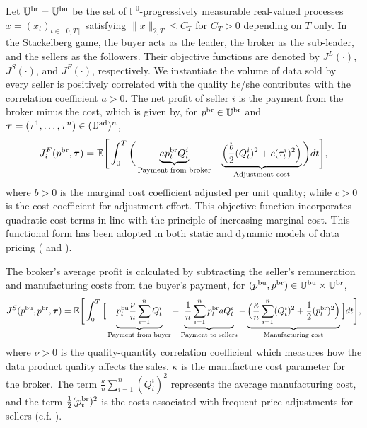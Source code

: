 \documentclass[11pt]{article}
\numberwithin{equation}{section}
\begin{document}
Let $\mathbb{U}^{\rm br}=\mathbb{U}^{\rm bu}$ be the set of $\mathbb{F}^0$-progressively measurable real-valued processes $x=(x_t)_{t\in[0,T]}$ satisfying $\|x\|_{2,T}\leq C_T$ for $C_T>0$ depending on $T$ only.	In the Stackelberg game, the buyer acts as the leader, the broker as the sub-leader, and the sellers as the followers. Their objective functions are denoted by $J^L(\cdot)$, $J^S(\cdot)$, and $J^F(\cdot)$, respectively.  We instantiate the volume of data sold by every seller is positively correlated with the quality he/she contributes with the correlation coefficient $a >0$. The net profit of seller $i$ is the payment from the broker minus the cost, which is given by, for $p^{\rm br}\in\mathbb{U}^{\rm br}$ and $\boldsymbol{\tau}=(\tau^1,\ldots,\tau^n)\in(\mathbb{U}^{{\rm ad}})^n$,
\begin{align}\label{eq:JiF}
		J_i^F(p^{\rm br}, \boldsymbol{\tau})=\mathbb{E}\Bigg[\int_0^T\bigg(\underbrace{a p_t^{\rm br}Q_t^i}_{\text{Payment from broker}}-\underbrace{\Big(\frac{b }{2}(Q_t^i)^2+c  (\tau_t^i)^2\Big)}_{\text{Adjustment cost}}\bigg)dt\Bigg],  
	\end{align}
where $b>0$ is the marginal cost coefficient adjusted per unit quality; while $c>0$ is the cost coefficient for adjustment effort. This objective function incorporates quadratic cost terms in line with the principle of increasing marginal cost. This functional form has been adopted in both static and dynamic models of data pricing (\cite{BL24} and \cite{AX21}).
	
The broker's average profit is calculated by subtracting the seller's remuneration and manufacturing costs from the buyer's payment, for $(p^{\rm bu},p^{\rm br})\in\mathbb{U}^{\rm bu}\times\mathbb{U}^{\rm br}$,
	\begin{align}\label{eq:JSpbupbr}
		J^S(p^{{\rm bu}}, p^{{\rm br}}, \boldsymbol{\tau})=\mathbb{E}\Bigg[\int_0^T\Big[\underbrace{p_t^{{\rm bu}}\frac{\nu}{n}\sum_{i=1}^nQ_t^i}_{\text{Payment from buyer}}-\underbrace{\frac{1}{n}\sum_{i=1}^np_t^{{\rm br}}a Q_t^i}_{\text{Payment to sellers}}-\underbrace{\Big(\frac{\kappa}{n}\sum_{i=1}^n( Q_t^i)^2+\frac{1}{2}(p_t^{{\rm br}})^2\Big)}_{\text{Manufacturing cost}}\Big]dt\Bigg],    
	\end{align}    
where $\nu>0$ is the quality-quantity correlation coefficient which measures how the data product quality affects the sales. $\kappa$ is the manufacture cost parameter for the broker.  The term $\frac{\kappa}{n}\sum_{i=1}^n( Q_t^i)^2$ represents the average manufacturing cost, and the term $\frac{1}{2}(p_t^{\rm br})^2$ is the costs associated with frequent price adjustments for sellers (c.f. \cite{R82}). 
	
\end{document}
